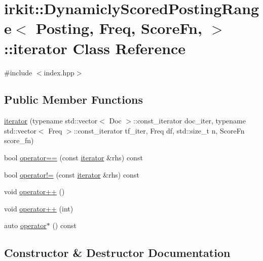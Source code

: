 \hypertarget{classirkit_1_1DynamiclyScoredPostingRange_1_1iterator}{}\section{irkit\+:\+:Dynamicly\+Scored\+Posting\+Range$<$ Posting, Freq, Score\+Fn, $>$\+:\+:iterator Class Reference}
\label{classirkit_1_1DynamiclyScoredPostingRange_1_1iterator}


{\ttfamily \#include $<$index.\+hpp$>$}

\subsection*{Public Member Functions}
\begin{DoxyCompactItemize}
\item 
\mbox{\hyperlink{classirkit_1_1DynamiclyScoredPostingRange_1_1iterator_a38fa17a6184b3a385a26deabfced6e18}{iterator}} (typename std\+::vector$<$ Doc $>$\+::const\+\_\+iterator doc\+\_\+iter, typename std\+::vector$<$ Freq $>$\+::const\+\_\+iterator tf\+\_\+iter, Freq df, std\+::size\+\_\+t n, Score\+Fn score\+\_\+fn)
\item 
bool \mbox{\hyperlink{classirkit_1_1DynamiclyScoredPostingRange_1_1iterator_ac097b4d56a87359fe0f726042d639cc9}{operator==}} (const \mbox{\hyperlink{classirkit_1_1DynamiclyScoredPostingRange_1_1iterator}{iterator}} \&rhs) const
\item 
bool \mbox{\hyperlink{classirkit_1_1DynamiclyScoredPostingRange_1_1iterator_a37c62809d2e9dd22e2be51833bf9de38}{operator!=}} (const \mbox{\hyperlink{classirkit_1_1DynamiclyScoredPostingRange_1_1iterator}{iterator}} \&rhs) const
\item 
void \mbox{\hyperlink{classirkit_1_1DynamiclyScoredPostingRange_1_1iterator_aeb75d55de7b324e3ff31aa7496a0f7c5}{operator++}} ()
\item 
void \mbox{\hyperlink{classirkit_1_1DynamiclyScoredPostingRange_1_1iterator_a0e72e53fba01c4ef07f4ee4495fb786b}{operator++}} (int)
\item 
auto \mbox{\hyperlink{classirkit_1_1DynamiclyScoredPostingRange_1_1iterator_a1608a0963401d8842b1f0e3726e44449}{operator$\ast$}} () const
\end{DoxyCompactItemize}


\subsection{Constructor \& Destructor Documentation}
\mbox{\label{classirkit_1_1DynamiclyScoredPostingRange_1_1iterator_a38fa17a6184b3a385a26deabfced6e18}} 
